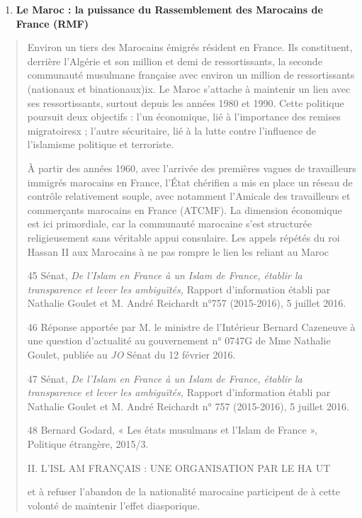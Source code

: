 \begin{enumerate}
\def\labelenumi{\arabic{enumi}.}
\setcounter{enumi}{1}
\item
  \textbf{Le Maroc : la puissance du Rassemblement des Marocains de
  France (RMF)}
\end{enumerate}

\begin{quote}
Environ un tiers des Marocains émigrés résident en France. Ils
constituent, derrière l'Algérie et son million et demi de
ressortissants, la seconde communauté musulmane française avec environ
un million de ressortissants (nationaux et binationaux)ix. Le Maroc
s'attache à maintenir un lien avec ses ressortissants, surtout depuis
les années 1980 et 1990. Cette politique poursuit deux objectifs : l'un
économique, lié à l'importance des remises migratoiresx ; l'autre
sécuritaire, lié à la lutte contre l'influence de l'islamisme politique
et terroriste.

À partir des années 1960, avec l'arrivée des premières vagues de
travailleurs immigrés marocains en France, l'État chérifien a mis en
place un réseau de contrôle relativement souple, avec notamment
l'Amicale des travailleurs et commerçants marocains en France (ATCMF).
La dimension économique est ici primordiale, car la communauté marocaine
s'est structurée religieusement sans véritable appui consulaire. Les
appels répétés du roi Hassan II aux Marocains à ne pas rompre le lien
les reliant au Maroc

45 Sénat, \emph{De l'Islam en France à un Islam de France, établir la
transparence et lever les ambiguïtés,} Rapport d'information établi par
Nathalie Goulet et M. André Reichardt n°757 (2015-2016), 5 juillet 2016.

46 Réponse apportée par M. le ministre de l'Intérieur Bernard Cazeneuve
à une question d'actualité au gouvernement n° 0747G de Mme Nathalie
Goulet, publiée au \emph{JO} Sénat du 12 février 2016.

47 Sénat, \emph{De l'Islam en France à un Islam de France, établir la
transparence et lever les ambiguïtés,} Rapport d'information établi par
Nathalie Goulet et M. André Reichardt n° 757 (2015-2016), 5 juillet
2016.

48 Bernard Godard, « Les états musulmans et l'Islam de France »,
Politique étrangère, 2015/3.

II. L'ISL AM FRANÇAIS : UNE ORGANISATION PAR LE HA UT

et à refuser l'abandon de la nationalité marocaine participent de à
cette volonté de maintenir l'effet diasporique.


\end{quote}
